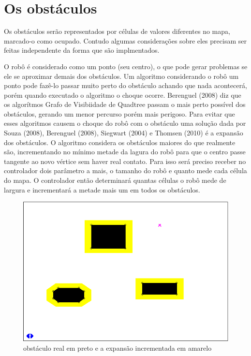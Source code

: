 \section{Os obstáculos}

Os obstáculos serão representados por células de valores diferentes no mapa, marcado-o como ocupado. Contudo algumas considerações sobre eles precisam ser feitas independente da forma que são implmentados.

O robô é considerado como um ponto (seu centro), o que pode gerar problemas se ele se aproximar demais dos obstáculos. Um algoritmo considerando o robô um ponto pode fazê-lo passar muito perto do obstáculo achando que nada acontecerá, porém quando executado o algoritmo o choque ocorre. Berenguel (2008) diz que os algorítmos Grafo de Visibiidade de Quadtree passam o mais perto possível dos obstáculos, gerando um menor percurso porém mais perigoso. Para evitar que esses algoritmos causem o choque do robô com o obstáculo uma solução dada por Souza (2008), Berenguel (2008), Siegwart (2004) e Thomsen (2010) é a expansão dos obstáculos. O algoritmo considera os obstáculos maiores do que realmente são, incrementando no mínimo metade da lagura do robô para que o centro passe tangente ao novo vértice sem haver real contato. Para isso será preciso receber no controlador dois parâmetro a mais, o tamanho do robô e quanto mede cada célula do mapa. O controlador então determinará quantas células o robô mede de largura e incrementará a metade mais um em todos os obstáculos.

\begin{figure}[h]
	\centering
	\label{fig27}
		\includegraphics[keepaspectratio=true,scale=0.5]{figuras/expansao.png}
	\caption{obstáculo real em preto e a expansão incrementada em amarelo}
\end{figure}

